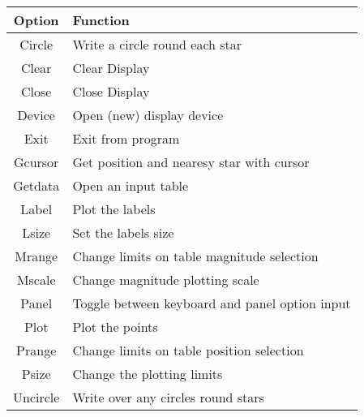 {{\begin{tabular}{|c|l|}\hline
   Option  &    Function \\ \hline
   Circle   &   Write a circle round each star \\
   Clear    &   Clear Display \\
   Close    &   Close Display \\
   Device   &   Open (new) display device \\
   Exit     &   Exit from program \\
   Gcursor  &   Get position and nearesy star with cursor \\
   Getdata  &   Open an input table \\
   Label    &   Plot the labels \\
   Lsize    &   Set the labels size \\
   Mrange   &   Change limits on table magnitude selection \\ 
   Mscale   &   Change magnitude plotting scale \\
   Panel    &   Toggle between keyboard and panel option input \\
   Plot     &   Plot the points \\
   Prange   &   Change limits on table position selection \\
   Psize    &   Change the plotting limits \\
   Uncircle &   Write over any circles round stars \\ \hline
\end{tabular}
                                                                               
}}
